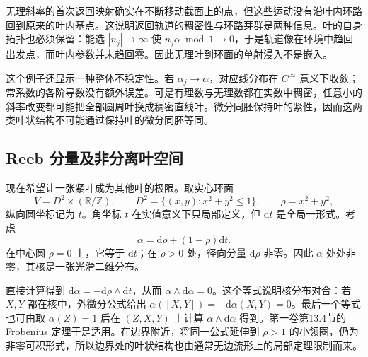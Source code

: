 无理斜率的首次返回映射确实在不断移动截面上的点，但这些运动没有沿叶内环路回到原来的叶内基点。这说明返回轨道的稠密性与环路芽群是两种信息。叶的自身拓扑也必须保留：能选 \(|n_j|\to\infty\) 使 \(n_j\alpha\bmod1\to0\)，于是轨道像在环境中趋回出发点，而叶内参数并未趋回零。因此无理叶到环面的单射浸入不是嵌入。

\ProseParagraphBreak

这个例子还显示一种整体不稳定性。若 \(\alpha_j\to\alpha\)，对应线分布在 \(C^\infty\) 意义下收敛；常系数的各阶导数没有额外误差。可是有理数与无理数都在实数中稠密，任意小的斜率改变都可能把全部圆周叶换成稠密直线叶。微分同胚保持叶的紧性，因而这两类叶状结构不可能通过保持叶的微分同胚等同。

\subsection{Reeb 分量及非分离叶空间}
\label{g2:subsec:D02:02}

现在希望让一张紧叶成为其他叶的极限。取实心环面
\[
	V=D^2\times(\mathbb R/\mathbb Z),\qquad
	D^2=\{(x,y):x^2+y^2\le1\},\qquad \rho=x^2+y^2,
\]
纵向圆坐标记为 \(t\)。角坐标 \(t\) 在实值意义下只局部定义，但 \(\mathrm dt\) 是全局一形式。考虑
\begin{equation}\label{g2:eq:reeb-solid-torus-form}
	\alpha=\mathrm d\rho+(1-\rho)\mathrm dt.
\end{equation}
在中心圆 \(\rho=0\) 上，它等于 \(\mathrm dt\)；在 \(\rho>0\) 处，径向分量 \(\mathrm d\rho\) 非零。因此 \(\alpha\) 处处非零，其核是一张光滑二维分布。

\ProseParagraphBreak

直接计算得到 \(\mathrm d\alpha=-\mathrm d\rho\wedge\mathrm dt\)，从而 \(\alpha\wedge\mathrm d\alpha=0\)。这个等式说明核分布对合：若 \(X,Y\) 都在核中，外微分公式给出 \(\alpha([X,Y])=-\mathrm d\alpha(X,Y)=0\)。最后一个等式也可由取 \(\alpha(Z)=1\) 后在 \((Z,X,Y)\) 上计算 \(\alpha\wedge\mathrm d\alpha\) 得到。第一卷第13.4节的 Frobenius 定理于是适用。在边界附近，将同一公式延伸到 \(\rho>1\) 的小领圈，仍为非零可积形式，所以边界处的叶状结构也由通常无边流形上的局部定理限制而来。


